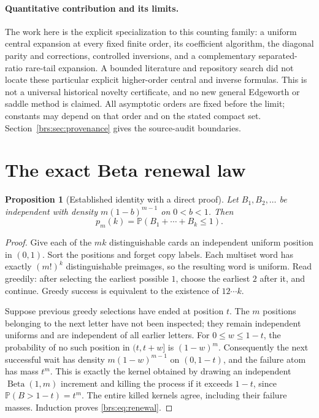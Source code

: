 \documentclass[11pt]{article}
\numberwithin{equation}{section}
\newtheorem{proposition}[theorem]{Proposition}
\theoremstyle{remark}\newtheorem{remark}[theorem]{Remark}
\newcommand{\Prob}{\mathbb P}\newcommand{\E}{\mathbb E}\newcommand{\He}{\operatorname{He}}
\begin{document}
\paragraph{Quantitative contribution and its limits.}
The work here is the explicit specialization to this counting family:
a uniform central expansion at every fixed finite order, its coefficient
algorithm, the diagonal parity and corrections, controlled inversions,
and a complementary separated-ratio rare-tail expansion.  A bounded
literature and repository search did not locate these particular explicit
higher-order central and inverse formulas.  This is not a universal
historical novelty certificate, and no new general Edgeworth or saddle
method is claimed.  All asymptotic orders are fixed before the limit;
constants may depend on that order and on the stated compact set.
Section~\ref{brs:sec:provenance} gives the source-audit boundaries.

\section{The exact Beta renewal law}

\begin{proposition}[Established identity with a direct proof]\label{brs:prop:renewal}
Let $B_1,B_2,\ldots$ be independent with density
$m(1-b)^{m-1}$ on $0<b<1$.  Then
\begin{equation}\label{brs:eq:renewal}
 p_m(k)=\Prob(B_1+\cdots+B_k\leq1).
\end{equation}
\end{proposition}
\begin{proof}
Give each of the $mk$ distinguishable cards an independent uniform
position in $(0,1)$.  Sort the positions and forget copy labels.  Each
multiset word has exactly $(m!)^k$ distinguishable preimages, so the
resulting word is uniform.  Read greedily: after selecting the earliest
possible $1$, choose the earliest $2$ after it, and continue.  Greedy
success is equivalent to the existence of $12\cdots k$.

Suppose previous greedy selections have ended at position $t$.  The
$m$ positions belonging to the next letter have not been inspected; they
remain independent uniforms and are independent of all earlier letters.
For $0\leq w\leq1-t$, the probability of no such position in $(t,t+w]$ is
$(1-w)^m$.  Consequently the next successful wait has density
$m(1-w)^{m-1}$ on $(0,1-t)$, and the failure atom has mass $t^m$.
This is exactly the kernel obtained by drawing an independent
$\operatorname{Beta}(1,m)$ increment and killing the process if it exceeds
$1-t$, since $\Prob(B>1-t)=t^m$.  The entire killed kernels agree, including
their failure masses.  Induction proves \eqref{brs:eq:renewal}.
\end{proof}
\end{document}
